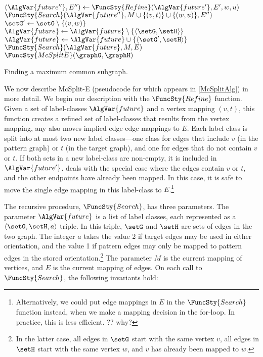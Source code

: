 \begin{algorithm}[htb]
{{{\nl        $(\AlgVar{future''}, E'') \gets \FuncSty{Refine}(\AlgVar{future'}, E', w, u)$ \;
\nl        $\FuncSty{Search}(\AlgVar{future''}, M\cup \{(v,t)\} \cup \{(w,u)\}, E'')$ \label{ExpandWithtu} \;
       } 
  }
\nl $\setG' \gets \setG \setminus \{(v,w)\}$ \label{RemoveVW} \;
\nl $\AlgVar{future} \gets \AlgVar{future} \setminus \{\langle \setG,\setH \rangle\}$\;
\nl {} {$\AlgVar{future} \gets \AlgVar{future} \cup \{\langle \setG',\setH \rangle \}$}
\nl $\FuncSty{Search}(\AlgVar{future},M,E)$ \label{ExpandWithoutVW} \;
}
\;
\nl $\FuncSty{McSplitE}(\graphG,\graphH)$ \label{McSplitFun} \;
\nl {}
\caption{Finding a maximum common subgraph.}
\label{McSplitAlg}
\end{algorithm}

We now describe McSplit-E (pseudocode for which appears in \cref{McSplitAlg})
in more detail.
We begin our description with the $\FuncSty{Refine}$ function.  Given a set of label-classes
$\AlgVar{future}$ and a vertex mapping $(v,t)$, this function
creates a refined set of label-classes that results from the vertex mapping,
any also moves implied edge-edge mappings to $E$.  Each label-class is split into at most
two new label classes---one class for edges that include $v$ (in the pattern graph) or $t$
(in the target graph), and one for edges that do not contain $v$ or $t$.  If both sets in a new
label-class are non-empty, it is included in $\AlgVar{future'}$.   deals with the
special case where the edges contain $v$ or $t$, and the other endpoints have already been mapped.
In this case, it is safe to move the single edge mapping in this label-class to $E$.\footnote{Alternatively,
we could put edge mappings in $E$ in the $\FuncSty{Search}$ function instead, when we make a mapping decision
in the for-loop.  In practice, this is less efficient.  ?? why?}

The recursive procedure,
$\FuncSty{Search}$, has three parameters.  The parameter $\AlgVar{future}$ is a
list of label classes, each represented as a $\langle \setG, \setH, a\rangle$
triple.  In this triple, $\setG$ and $\setH$ are sets of edges in the two
graph.  The integer $a$ takes the value 2 if target edges may be used in either
orientation, and the value 1 if pattern edges may only be mapped to pattern
edges in the stored orientation.\footnote{In the latter case, all edges in
$\setG$ start with the same vertex $v$, all edges in $\setH$ start with the
same vertex $w$, and $v$ has already been mapped to $w$.}  The parameter $M$ is
the current mapping of vertices, and $E$ is the current mapping of edges.  On
each call to $\FuncSty{Search}$, the following invariants hold:

